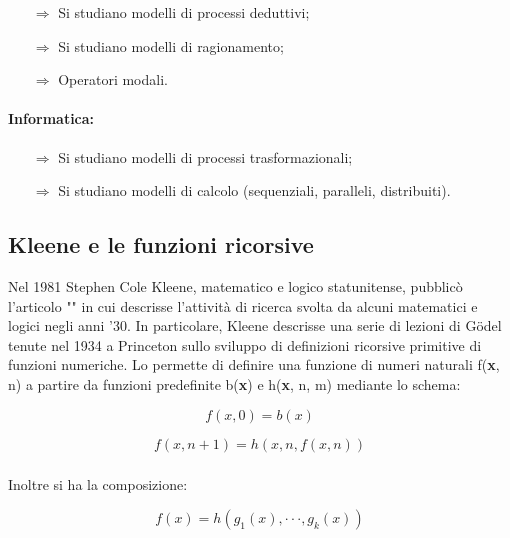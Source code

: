 \begin{itemize}
    \item [$\Rightarrow$] Si studiano modelli di processi deduttivi;
    \item [$\Rightarrow$] Si studiano modelli di ragionamento;
    \item [$\Rightarrow$] Operatori modali.
\end{itemize}

\paragraph{Informatica:}

\begin{itemize}
    \item [$\Rightarrow$] Si studiano modelli di processi trasformazionali;
    \item [$\Rightarrow$] Si studiano modelli di calcolo (sequenziali, paralleli, distribuiti).
\end{itemize}


\subsection{Kleene e le funzioni ricorsive}

Nel 1981 Stephen Cole Kleene, matematico e logico statunitense,
pubblicò l'articolo "" in cui
descrisse l'attività di ricerca svolta da alcuni matematici
e logici negli anni '30. In particolare, Kleene descrisse
una serie di lezioni di G\"odel tenute nel 1934 a Princeton
sullo sviluppo di definizioni ricorsive primitive di funzioni 
numeriche. Lo  permette di
definire una funzione di numeri naturali f(\textbf{x}, n) a partire da funzioni 
predefinite b(\textbf{x}) e h(\textbf{x}, n, m) mediante lo schema:

$$f(x, 0) = b(x)$$

$$f(x, n + 1) = h(x, n , f(x, n))$$
\subsubsection*{}
Inoltre si ha la composizione:

$$f(x) = h(g_1(x), \cdot\cdot\cdot, g_k(x))$$

\subsubsection*{}

